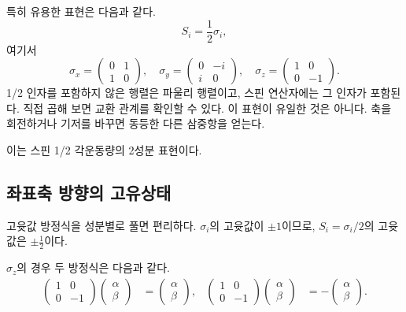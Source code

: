 특히 유용한 표현은 다음과 같다.
\begin{equation}
S_i=\frac12\sigma_i,
\end{equation}
여기서
\begin{equation}
\sigma_x=
\begin{pmatrix}
0&1\\
1&0
\end{pmatrix},
\quad
\sigma_y=
\begin{pmatrix}
0&-i\\
i&0
\end{pmatrix},
\quad
\sigma_z=
\begin{pmatrix}
1&0\\
0&-1
\end{pmatrix}.
\end{equation}
1/2 인자를 포함하지 않은 행렬은 파울리 행렬이고, 스핀 연산자에는 그 인자가 포함된다. 직접 곱해 보면 교환 관계를 확인할 수 있다. 이 표현이 유일한 것은 아니다. 축을 회전하거나 기저를 바꾸면 동등한 다른 삼중항을 얻는다.

이는 스핀 1/2 각운동량의 2성분 표현이다.

\subsection{좌표축 방향의 고유상태}

고윳값 방정식을 성분별로 풀면 편리하다. \(\sigma_i\)의 고윳값이 \(\pm1\)이므로, \(S_i=\sigma_i/2\)의 고윳값은 \(\pm\tfrac12\)이다.

\(\sigma_z\)의 경우 두 방정식은 다음과 같다.
\begin{align}
\begin{pmatrix}
1&0\\
0&-1
\end{pmatrix}
\begin{pmatrix}
\alpha\\
\beta
\end{pmatrix}
&=
\begin{pmatrix}
\alpha\\
\beta
\end{pmatrix},
&
\begin{pmatrix}
1&0\\
0&-1
\end{pmatrix}
\begin{pmatrix}
\alpha\\
\beta
\end{pmatrix}
&=
-
\begin{pmatrix}
\alpha\\
\beta
\end{pmatrix}.
\end{align}

